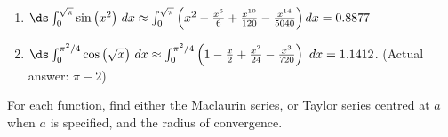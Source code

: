 \begin{enumialphparenastyle}
\begin{ex}
\begin{sol}
\begin{enumerate}
\item 
{$\ds \int_0^{\sqrt{\pi}} \sin \big(x^2\big)\ dx \approx \int_0^{\sqrt{\pi}} \left(x^2-\frac{x^6}6+\frac{x^{10}}{120}-\frac{x^{14}}{5040}\right) dx = 0.8877$
}
\item
{$\ds \int_0^{\pi^2/4} \cos \big(\sqrt{x}\big)\ dx \approx \int_0^{\pi^2/4} \left(1-\frac x2+\frac{x^2}{24}-\frac{x^3}{720}\right)\ dx = 1.1412$. (Actual answer: $\pi-2$)
}
\end{enumerate}
\end{sol}

\end{ex}




\begin{ex}
For each function, find either the Maclaurin series, or Taylor series centred
at $a$ when $ a $ is specified, and the radius of convergence.


\end{ex}
\end{enumialphparenastyle}
